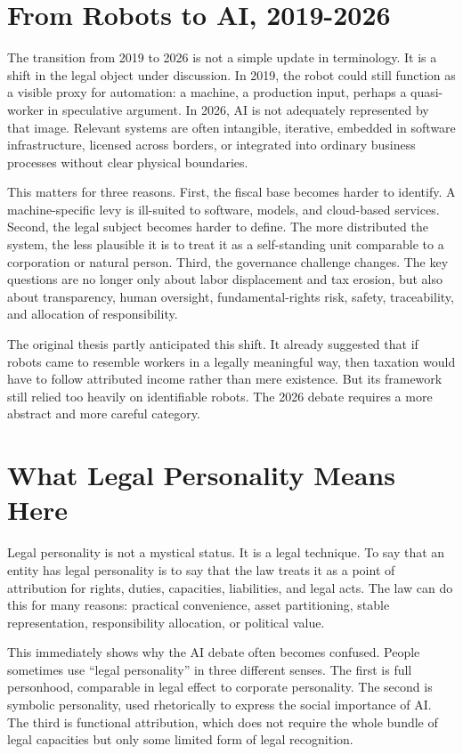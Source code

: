 \documentclass[11pt]{article}
\begin{document}
\section{From Robots to AI, 2019-2026}
The transition from 2019 to 2026 is not a simple update in terminology. It is a shift in the legal object under discussion. In 2019, the robot could still function as a visible proxy for automation: a machine, a production input, perhaps a quasi-worker in speculative argument. In 2026, AI is not adequately represented by that image. Relevant systems are often intangible, iterative, embedded in software infrastructure, licensed across borders, or integrated into ordinary business processes without clear physical boundaries.

This matters for three reasons. First, the fiscal base becomes harder to identify. A machine-specific levy is ill-suited to software, models, and cloud-based services. Second, the legal subject becomes harder to define. The more distributed the system, the less plausible it is to treat it as a self-standing unit comparable to a corporation or natural person. Third, the governance challenge changes. The key questions are no longer only about labor displacement and tax erosion, but also about transparency, human oversight, fundamental-rights risk, safety, traceability, and allocation of responsibility.

The original thesis partly anticipated this shift. It already suggested that if robots came to resemble workers in a legally meaningful way, then taxation would have to follow attributed income rather than mere existence. But its framework still relied too heavily on identifiable robots. The 2026 debate requires a more abstract and more careful category.

\section{What Legal Personality Means Here}
Legal personality is not a mystical status. It is a legal technique. To say that an entity has legal personality is to say that the law treats it as a point of attribution for rights, duties, capacities, liabilities, and legal acts. The law can do this for many reasons: practical convenience, asset partitioning, stable representation, responsibility allocation, or political value.

This immediately shows why the AI debate often becomes confused. People sometimes use ``legal personality'' in three different senses. The first is full personhood, comparable in legal effect to corporate personality. The second is symbolic personality, used rhetorically to express the social importance of AI. The third is functional attribution, which does not require the whole bundle of legal capacities but only some limited form of legal recognition.
\end{document}
